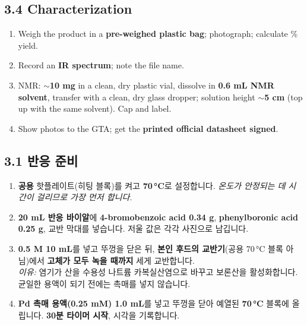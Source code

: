 \documentclass[10pt,a4paper]{article}
\begin{document}
\subsection*{3.4 Characterization}
\begin{enumerate}[leftmargin=7mm,itemsep=1.2mm,label=\cbox\ \arabic*.,resume]
\item Weigh the product in a \textbf{pre-weighed plastic bag}; photograph; calculate \% yield.
\item Record an \textbf{IR spectrum}; note the file name.
\item NMR: \textbf{$\sim$10 mg} in a clean, dry plastic vial, dissolve in \textbf{0.6 mL NMR solvent}, transfer with a clean, dry glass dropper; solution height \textbf{$\sim$5 cm} (top up with the same solvent). Cap and label.
\item Show photos to the GTA; get the \textbf{printed official datasheet signed}.
\end{enumerate}

\newpage
{}

\subsection*{3.1 반응 준비}
\begin{enumerate}[leftmargin=7mm,itemsep=1.2mm,label=\cbox\ \arabic*.]
\item \textbf{공용} 핫플레이트(히팅 블록)를 켜고 \textbf{70\,\si{\celsius}}로 설정합니다. \emph{온도가 안정되는 데 시간이 걸리므로 가장 먼저 합니다.}
\item \textbf{20 mL 반응 바이알}에 \textbf{4-bromobenzoic acid 0.34 g}, \textbf{phenylboronic acid 0.25 g}, 교반 막대를 넣습니다. 저울 값은 각각 사진으로 남깁니다.
\item \textbf{0.5 M  10 mL}를 넣고 뚜껑을 닫은 뒤, \textbf{본인 후드의 교반기}(공용 70\,\si{\celsius} 블록 아님)에서 \textbf{고체가 모두 녹을 때까지} 세게 교반합니다.\\
{\footnotesize \emph{이유:} 염기가 산을 수용성 나트륨 카복실산염으로 바꾸고 보론산을 활성화합니다. 균일한 용액이 되기 전에는 촉매를 넣지 않습니다.}
\item \textbf{Pd 촉매 용액(0.25 mM) 1.0 mL}를 넣고 뚜껑을 닫아 예열된 \textbf{70\,\si{\celsius}} 블록에 올립니다. \textbf{30분 타이머 시작}, 시각을 기록합니다.
\end{enumerate}
\end{document}
